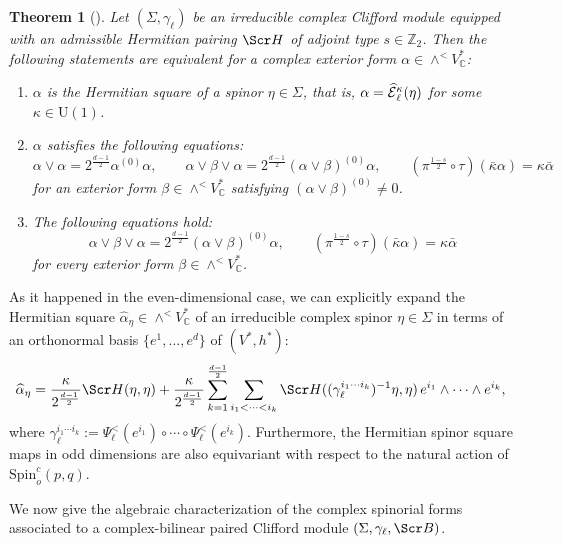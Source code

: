 \documentclass[10pt,a4paper,twoside,reqno]{amsart}
\theoremstyle{plain}
\newtheorem{thm}{Theorem}[section]
\theoremstyle{definition}
\theoremstyle{remark}
\def\C{\mathbb{C}}
\def\scB{\Scr B}
\def\scS{\Scr H}
\def\Spin{\mathrm{Spin}}
\def\Spin{\mathrm{Spin}}
\def\U{\mathrm{U}}
\def\hcE{\smash{\widehat{\mathcal{E}}}}
\begin{document}
\begin{thm}[{\cite[Thm.\ 4.4]{Algebraic_Complex_Square_2025}}]\label{thm_Hermitian_square_odd}
    Let $(\Sigma,\gamma_\ell)$ be an irreducible complex Clifford module equipped with an admissible Hermitian pairing $\scS$ of adjoint type $s\in\mathbb{Z}_2$. Then the following statements are equivalent for a complex exterior form $\alpha\in\wedge^<V^*_\C$: \begin{enumerate}
        \item[\normalfont(a)] $\alpha$ is the Hermitian square of a spinor $\eta\in\Sigma$, that is, $\alpha=\hcE_\ell^\kappa(\eta)$ for some $\kappa\in\U(1)$.
        \item[\normalfont(b)] $\alpha$ satisfies the following equations: $$\alpha\vee\alpha = 2^{\frac{d-1}{2}}\alpha^{(0)}\alpha,\qquad\alpha\vee\beta\vee\alpha=2^{\frac{d-1}{2}}(\alpha\vee\beta)^{(0)}\alpha,\qquad(\pi^{\frac{1-s}{2}}\circ\tau)(\bar\kappa\alpha) = \kappa \bar{\alpha}$$ for an exterior form $\beta\in\wedge^<V^*_\C$ satisfying $(\alpha\vee\beta)^{(0)}\neq0$.
        \item[\normalfont(c)] The following equations hold: $$\alpha\vee\beta\vee\alpha=2^{\frac{d-1}{2}}(\alpha\vee\beta)^{(0)}\alpha,\qquad(\pi^{\frac{1-s}{2}}\circ\tau)(\bar\kappa\alpha) = \kappa \bar{\alpha}$$ for every exterior form $\beta\in\wedge^<V^*_\C$.
    \end{enumerate}
\end{thm}

As it happened in the even-dimensional case, we can explicitly expand the Hermitian square $\widehat{\alpha}_\eta\in\wedge^<V^*_\C$ of an irreducible complex spinor $\eta\in\Sigma$ in terms of an orthonormal basis $\{e^1,\ldots,e^d\}$ of $(V^*,h^*)$: \begin{equation*}\label{eq:oddhermitianexpansion}
    \widehat{\alpha}_{\eta} = \frac{\kappa}{2^{\frac{d-1}{2}}} \scS(\eta,\eta) + \frac{\kappa}{2^{\frac{d-1}{2}}} \sum_{k=1}^{\frac{d-1}{2}} \sum_{i_1 < \cdots < i_k} \scS((\gamma_\ell^{i_1 \cdots i_k})^{-1}\eta , \eta)\, e^{i_1}\wedge  \cdots \wedge e^{i_k},
\end{equation*} where $\gamma_\ell^{i_1\cdots i_k}:=\Psi^<_\ell(e^{i_1})\circ\cdots\circ\Psi^<_\ell(e^{i_k})$. Furthermore, the Hermitian spinor square maps in odd dimensions are also equivariant with respect to the natural action of $\Spin^c_o(p,q)$.\medskip

We now give the algebraic characterization of the complex spinorial forms associated to a complex-bilinear paired Clifford module $(\Sigma,\gamma_\ell,\scB)$.
\end{document}
